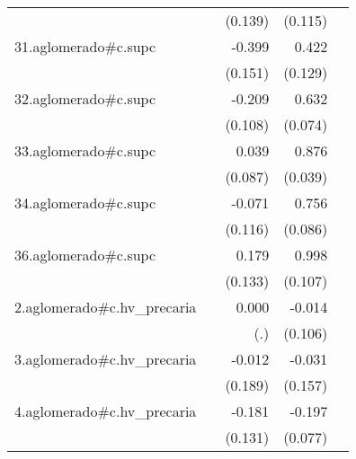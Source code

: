 {\begin{longtable}{l*{4}{D{.}{.}{-1}}}
            &                     &     (0.139)         &     (0.115)         &                     \\
\addlinespace
31.aglomerado#c.supc&                     &      -0.399\sym{**} &       0.422\sym{**} &                     \\
            &                     &     (0.151)         &     (0.129)         &                     \\
\addlinespace
32.aglomerado#c.supc&                     &      -0.209         &       0.632\sym{***}&                     \\
            &                     &     (0.108)         &     (0.074)         &                     \\
\addlinespace
33.aglomerado#c.supc&                     &       0.039         &       0.876\sym{***}&                     \\
            &                     &     (0.087)         &     (0.039)         &                     \\
\addlinespace
34.aglomerado#c.supc&                     &      -0.071         &       0.756\sym{***}&                     \\
            &                     &     (0.116)         &     (0.086)         &                     \\
\addlinespace
36.aglomerado#c.supc&                     &       0.179         &       0.998\sym{***}&                     \\
            &                     &     (0.133)         &     (0.107)         &                     \\
\addlinespace
2.aglomerado#c.hv\_precaria&                     &       0.000         &      -0.014         &                     \\
            &                     &         (.)         &     (0.106)         &                     \\
\addlinespace
3.aglomerado#c.hv\_precaria&                     &      -0.012         &      -0.031         &                     \\
            &                     &     (0.189)         &     (0.157)         &                     \\
\addlinespace
4.aglomerado#c.hv\_precaria&                     &      -0.181         &      -0.197\sym{*}  &                     \\
            &                     &     (0.131)         &     (0.077)         &                     \\

\end{longtable}}
